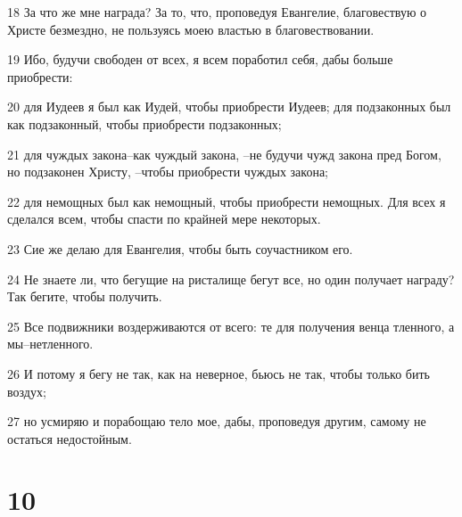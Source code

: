 \par 18 За что же мне награда? За то, что, проповедуя Евангелие, благовествую о Христе безмездно, не пользуясь моею властью в благовествовании.
\par 19 Ибо, будучи свободен от всех, я всем поработил себя, дабы больше приобрести:
\par 20 для Иудеев я был как Иудей, чтобы приобрести Иудеев; для подзаконных был как подзаконный, чтобы приобрести подзаконных;
\par 21 для чуждых закона--как чуждый закона, --не будучи чужд закона пред Богом, но подзаконен Христу, --чтобы приобрести чуждых закона;
\par 22 для немощных был как немощный, чтобы приобрести немощных. Для всех я сделался всем, чтобы спасти по крайней мере некоторых.
\par 23 Сие же делаю для Евангелия, чтобы быть соучастником его.
\par 24 Не знаете ли, что бегущие на ристалище бегут все, но один получает награду? Так бегите, чтобы получить.
\par 25 Все подвижники воздерживаются от всего: те для получения венца тленного, а мы--нетленного.
\par 26 И потому я бегу не так, как на неверное, бьюсь не так, чтобы только бить воздух;
\par 27 но усмиряю и порабощаю тело мое, дабы, проповедуя другим, самому не остаться недостойным.

\chapter{10}

